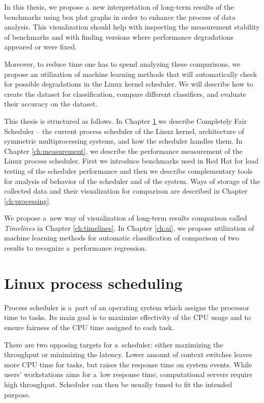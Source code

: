 In this thesis, we propose a~new interpretation of long-term results of the
benchmarks using box plot graphs in order to enhance the process of data
analysis. This visualization should help with inspecting the measurement
stability of benchmarks and with finding versions where performance degradations
appeared or were fixed.

Moreover, to reduce time one has to spend analyzing these comparisons,
we propose an utilization of machine learning methods that will
automatically check for possible degradations in the Linux kernel scheduler. We will
describe how to create the dataset for classification, compare different
classifiers, and evaluate their accuracy on the dataset.

This thesis is structured as follows. In Chapter \ref{ch:scheduler} we describe
Completely Fair Scheduler -- the current process scheduler of the Linux kernel,
architecture of symmetric multiprocessing systems, and how the scheduler handles
them. In Chapter \ref{ch:measurement}, we describe the performance measurement of
the Linux process scheduler. First we introduce benchmarks used in Red Hat for
load testing of the scheduler performance and then we describe complementary tools for analysis of
behavior of the scheduler and of the system. Ways of storage of the collected data
and their visualization for comparison are described in Chapter
\ref{ch:processing}.

We propose a~new way of visualization of long-term results comparison called
\emph{Timelines} in Chapter \ref{ch:timelines}. In Chapter
\ref{ch:ai}, we propose utilization of machine learning methods for automatic
classification of comparison of two results to recognize a~performance
regression.



\chapter{Linux process scheduling} \label{ch:scheduler}
Process scheduler is a~part of an operating system which assigns the processor
time to tasks. Its main goal is to maximize effectivity of the CPU usage and to
ensure fairness of the CPU time assigned to each task.

There are two opposing targets for a~scheduler: either maximizing the throughput or
minimizing the latency. Lower amount of context switches leaves more CPU time for
tasks, but raises the response time on system events.
While users' workstations aims for a~low response time, computational servers
require high throughput. Scheduler can then be usually tuned to fit the intended
purpose.

